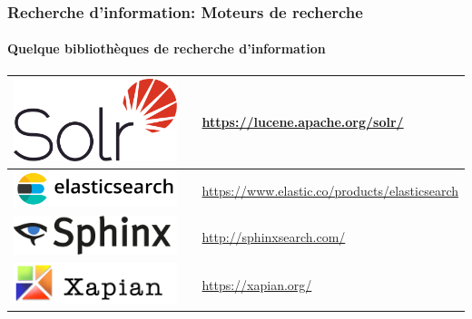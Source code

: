 \documentclass[xcolor=table]{beamer}
\begin{document}
\begin{frame}
\frametitle{Recherche d'information: Moteurs de recherche}
\framesubtitle{Quelque bibliothèques de recherche d'information}

\begin{tabular}{p{}cp{}}
	
	\hline
	
	\includegraphics[height=.8cm]{..//img/Bweb02-ri-gmail/solr-logo.png} &
	& 
	\url{https://lucene.apache.org/solr/}  \\
	
	\hline
	
	\includegraphics[height=.8cm]{..//img/Bweb02-ri-gmail/elastic-logo.png} &
	& 
	\url{https://www.elastic.co/products/elasticsearch} \\
	
	\hline
	
	\includegraphics[height=.8cm]{..//img/Bweb02-ri-gmail/sphinx-logo.png} & 
	& 
	\url{http://sphinxsearch.com/} \\
	
	\hline
	
	\includegraphics[height=.8cm]{..//img/Bweb02-ri-gmail/xapian-logo.png} & 
	& 
	\url{https://xapian.org/} \\
	
	\hline
	
\end{tabular}


\end{frame}
\end{document}
